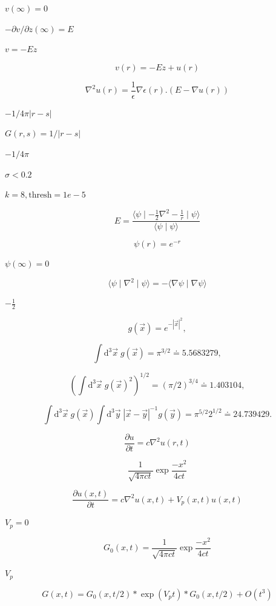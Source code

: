 \documentclass{article}
\begin{document}
$v(\infty)=0$
\pagebreak

$- \partial v / \partial z(\infty) = E$
\pagebreak

$v = - E z$
\pagebreak

\[
v(r) = - E z + u(r)
\]
\pagebreak

\[
   \nabla^2 u(r) = \frac{1}{\epsilon} \nabla \epsilon(r) .  \left(E - \nabla u(r) \right)
\]
\pagebreak

$-1 / 4 \pi |r-s|$
\pagebreak

$G(r,s) = 1/|r-s|$
\pagebreak

$-1/4\pi$
\pagebreak

$\sigma<0.2$
\pagebreak

$k=8, \mbox{thresh}=1e-5$
\pagebreak

\[
    E = \frac{\langle \psi \mid - \frac{1}{2}  \nabla^2  - \frac{1}{r} \mid \psi \rangle}{\langle \psi \mid \psi \rangle}
\]
\pagebreak

\[
   \psi(r) = e^{-r}
\]
\pagebreak

$ \psi(\infty)=0 $
\pagebreak

\[
     \langle \psi \mid \nabla^2 \mid \psi \rangle = - \langle \nabla \psi \mid \nabla \psi \rangle
\]
\pagebreak

$-\frac{1}{2}$
\pagebreak

\[ g(\vec{x}) = e^{-|\vec{x}|^2}, \]
\pagebreak

\[
   \int \mathrm{d}^3 \vec{x} \; g(\vec{x}) = \pi^{3/2} \doteq 5.5683279,
\]
\pagebreak

\[
   \left( \int \mathrm{d}^3 \vec{x} \; g(\vec{x})^2 \right)^{1/2} = (\pi/2)^{3/4} \doteq 1.403104,
\]
\pagebreak

\[
   \int \mathrm{d}^3 \vec{x} \; g(\vec{x}) \int \mathrm{d}^3 \vec{y} \; |\vec{x}-\vec{y}|^{-1} g(\vec{y}) = \pi^{5/2} 2^{1/2} \doteq 24.739429.
\]
\pagebreak

\[
\frac{\partial u}{\partial t} = c \nabla^2 u(r,t)
\]
\pagebreak

\[
\frac{1}{\sqrt{4 \pi c t}}  \exp \frac{-x^2}{4 c t}
\]
\pagebreak

\[
  \frac{\partial u(x,t)}{\partial t} = c \nabla^2 u(x,t) + V_p(x,t) u(x,t)
\]
\pagebreak

$ V_p = 0 $
\pagebreak

\[
  G_0(x,t) = \frac{1}{\sqrt{4 \pi c t}} \exp \frac{-x^2}{4 c t}
\]
\pagebreak

$ V_p $
\pagebreak

\[
  G(x,t) = G_0(x,t/2) * \exp(V_p t) * G_0(x,t/2) + O(t^3)
\]
\pagebreak
\end{document}
